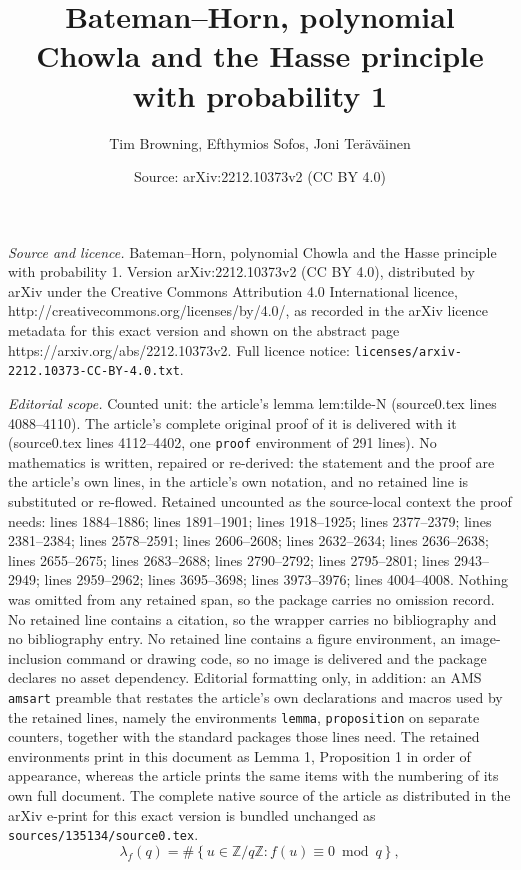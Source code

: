 \documentclass[10pt,a4paper]{amsart}
\title{Bateman--Horn, polynomial Chowla and the Hasse principle with probability 1}
\author{Tim Browning, Efthymios Sofos, Joni Ter\"av\"ainen}
\date{Source: arXiv:2212.10373v2 (CC BY 4.0)}
\newcommand\ZZ{\mathbb{Z}}
\begin{document}
\maketitle

\noindent\emph{Source and licence.} Bateman--Horn, polynomial Chowla and the Hasse principle with probability 1. Version arXiv:2212.10373v2 (CC BY 4.0), distributed by arXiv under the Creative Commons Attribution 4.0 International licence, http://creativecommons.org/licenses/by/4.0/, as recorded in the arXiv licence metadata for this exact version and shown on the abstract page https://arxiv.org/abs/2212.10373v2. Full licence notice: \texttt{licenses/arxiv-2212.10373-CC-BY-4.0.txt}.\par\smallskip

\noindent\textit{Editorial scope.} Counted unit: the article's lemma lem:tilde-N (source0.tex lines 4088--4110). The article's complete original proof of it is delivered with it (source0.tex lines 4112--4402, one \texttt{proof} environment of 291 lines). No mathematics is written, repaired or re-derived: the statement and the proof are the article's own lines, in the article's own notation, and no retained line is substituted or re-flowed.  Retained uncounted as the source-local context the proof needs: lines 1884--1886; lines 1891--1901; lines 1918--1925; lines 2377--2379; lines 2381--2384; lines 2578--2591; lines 2606--2608; lines 2632--2634; lines 2636--2638; lines 2655--2675; lines 2683--2688; lines 2790--2792; lines 2795--2801; lines 2943--2949; lines 2959--2962; lines 3695--3698; lines 3973--3976; lines 4004--4008.  Nothing was omitted from any retained span, so the package carries no omission record.  No retained line contains a citation, so the wrapper carries no bibliography and no bibliography entry.  No retained line contains a figure environment, an image-inclusion command or drawing code, so no image is delivered and the package declares no asset dependency.  Editorial formatting only, in addition: an AMS \texttt{amsart} preamble that restates the article's own declarations and macros used by the retained lines, namely the environments \texttt{lemma}, \texttt{proposition} on separate counters, together with the standard packages those lines need.  The retained environments print in this document as Lemma 1, Proposition 1 in order of appearance, whereas the article prints the same items with the numbering of its own full document.  The complete native source of the article as distributed in the arXiv e-print for this exact version is bundled unchanged as \texttt{sources/135134/source0.tex}.
\begin{equation}\label{eq:lambda}
\lambda_f(q)=\#\left\{u\in \ZZ/q\ZZ: f(u)\equiv 0\bmod{q}\right\},
\end{equation}
\end{document}
